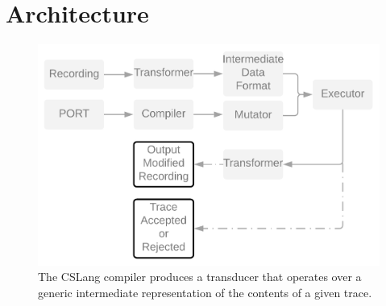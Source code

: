\section{Architecture}
\label{SEC:architecture}

\begin{figure}
  \includegraphics[scale=.08]{images/architecture}
  \caption{The CSLang compiler produces a transducer that operates over a
  generic intermediate representation of the contents of a given trace.}
  \label{fig:architecture}
\end{figure}


